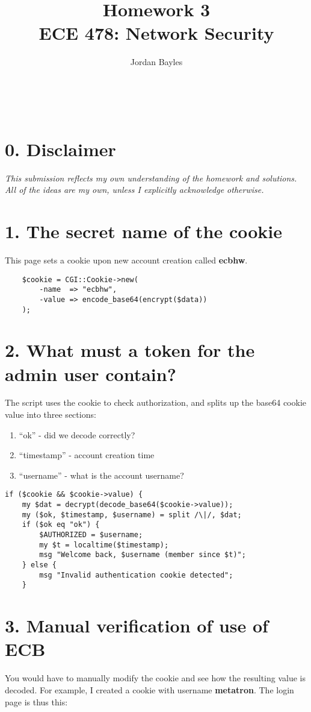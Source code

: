 \documentclass[12pt,letterpaper]{article}
\author{Jordan Bayles}
\title{Homework 3\\
\small ECE 478: Network Security}
\makeatletter
\let\thetitle\@title
\let\theauthor\@author
\let\thedate\@date
\makeatother
\begin{document}
\begin{flushright}
\theauthor\\
\thedate
\end{flushright}
\begin{center}
\thetitle
\end{center}

\section*{0. Disclaimer}
\emph{This submission reflects my own understanding of the homework and
solutions. All of the ideas are my own, unless I explicitly acknowledge otherwise.}

\section*{1. The secret name of the cookie}
This page sets a cookie upon new account creation called
\textbf{ecbhw}.

\begin{verbatim}
    $cookie = CGI::Cookie->new(
        -name  => "ecbhw",
        -value => encode_base64(encrypt($data))
    );
\end{verbatim}

\section{2. What must a token for the admin user contain?}
The script uses the cookie to check authorization, and splits
up the base64 cookie value into three sections:
\begin{enumerate}
\item ``ok'' - did we decode correctly?
\item ``timestamp'' - account creation time
\item ``username'' - what is the account username?
\end{enumerate}

\begin{verbatim}
if ($cookie && $cookie->value) {
    my $dat = decrypt(decode_base64($cookie->value));
    my ($ok, $timestamp, $username) = split /\|/, $dat;
    if ($ok eq "ok") {
        $AUTHORIZED = $username;
        my $t = localtime($timestamp);
        msg "Welcome back, $username (member since $t)";
    } else {
        msg "Invalid authentication cookie detected";
    }
\end{verbatim}

\section*{3. Manual verification of use of ECB}
You would have to manually modify the cookie and see how the resulting
value is decoded. For example, I created a cookie with username \textbf{metatron}. The login page is thus this:
\end{document}
